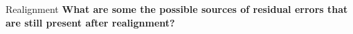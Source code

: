 \documentclass{beamer}
\begin{document}
\begin{frame}{Realignment}
  \textbf{What are some the possible sources of residual errors that are still present after realignment?}


\end{frame}

%
%
\end{document}
